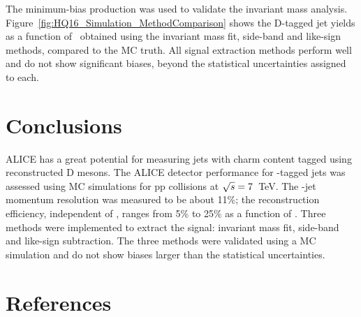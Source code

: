 \documentclass[a4paper]{jpconf}
\begin{document}
The minimum-bias production was used to validate the invariant mass analysis. 
Figure~\ref{fig:HQ16_Simulation_MethodComparison} shows the D-tagged jet yields as a function of \ptchjetdet\ obtained using the invariant mass fit, 
side-band and like-sign methods, compared to the MC truth. All signal extraction methods perform well and do not show significant biases, beyond the statistical uncertainties assigned to each.

\section{Conclusions}
ALICE has a great potential for measuring jets with charm content tagged using reconstructed D mesons.
The ALICE detector performance for \Dzero-tagged jets was assessed using MC simulations
for pp collisions at $\sqrt{s}=7$~TeV. The \Dzero-jet momentum resolution was measured to be about 11\%; the reconstruction efficiency, independent of \ptchjet, ranges from 5\% to 25\% as a function of \ptd.
Three methods were implemented to extract the signal: invariant mass fit, side-band and like-sign subtraction.
The three methods were validated using a MC simulation and do not show biases larger than the statistical uncertainties.

\section*{References}
{}

\end{document}
